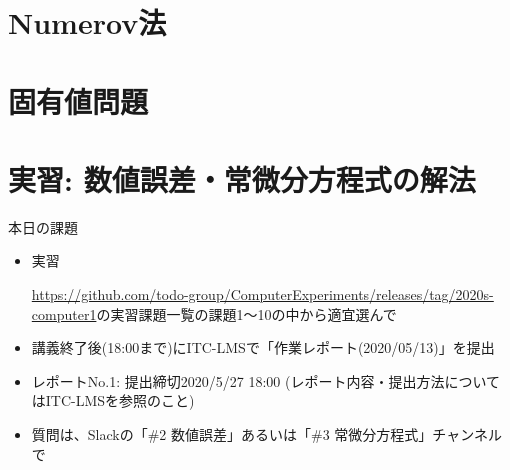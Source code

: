 \documentclass[10pt,dvipdfmx]{beamer}
\begin{document}




\section{Numerov法}







\section{固有値問題}



\section{実習: 数値誤差・常微分方程式の解法}

\begin{frame}[t]{本日の課題}
  \begin{itemize}
  \item 実習
    
    \url{https://github.com/todo-group/ComputerExperiments/releases/tag/2020s-computer1}の実習課題一覧の課題1〜10の中から適宜選んで
    
  \item 講義終了後(18:00まで)にITC-LMSで「作業レポート(2020/05/13)」を提出
  \item レポートNo.1: 提出締切2020/5/27 18:00 (レポート内容・提出方法についてはITC-LMSを参照のこと)
  \item 質問は、Slackの「\#2 数値誤差」あるいは「\#3 常微分方程式」チャンネルで
  \end{itemize}
\end{frame}



\end{document}
